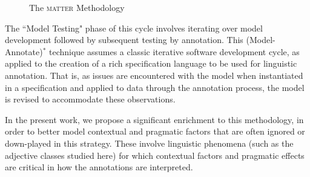 \documentclass[10pt]{article}
\begin{document}
\begin{figure}[h]
  \centering
  \caption{The \textsc{matter} Methodology}
  \label{fig:matter}
\end{figure}

\noindent 
The ``Model Testing" phase of this cycle involves iterating over model development followed by subsequent testing by annotation.  	This  (Model-Annotate)$^*$ technique assumes a classic iterative software development cycle, as applied to the creation of a rich specification language to be used for linguistic annotation.  That is, as issues are encountered
with the model when instantiated in a specification and applied to data
through the annotation process, the model is revised to accommodate
these observations. 

In the present work, we propose a significant enrichment to this methodology, in order to better
model  contextual and pragmatic factors that are often ignored or down-played in this strategy. 
These involve linguistic phenomena (such as the adjective classes studied here) for which contextual factors and pragmatic effects are critical in how the annotations are interpreted.  
\end{document}
